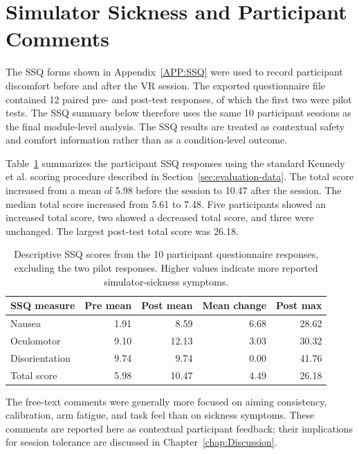 \section{Simulator Sickness and Participant Comments}
\label{sec:results-ssq}

The SSQ forms shown in Appendix~\ref{APP:SSQ} were used to record participant discomfort before and after the VR session. The exported questionnaire file contained 12 paired pre- and post-test responses, of which the first two were pilot tests. The SSQ summary below therefore uses the same 10 participant sessions as the final module-level analysis. The SSQ results are treated as contextual safety and comfort information rather than as a condition-level outcome.

Table~\ref{tab:results-ssq-summary} summarizes the participant SSQ responses using the standard Kennedy et al. scoring procedure described in Section~\ref{sec:evaluation-data}. The total score increased from a mean of 5.98 before the session to 10.47 after the session. The median total score increased from 5.61 to 7.48. Five participants showed an increased total score, two showed a decreased total score, and three were unchanged. The largest post-test total score was 26.18.

\begin{table}[H]
    \centering
    \footnotesize
    \setlength{\tabcolsep}{5pt}
    \renewcommand{\arraystretch}{1.15}
    \begin{tabular}{lrrrr}
        \toprule
        \textbf{SSQ measure} & \textbf{Pre mean} & \textbf{Post mean} & \textbf{Mean change} & \textbf{Post max} \\
        \midrule
        Nausea & 1.91 & 8.59 & 6.68 & 28.62 \\
        Oculomotor & 9.10 & 12.13 & 3.03 & 30.32 \\
        Disorientation & 9.74 & 9.74 & 0.00 & 41.76 \\
        Total score & 5.98 & 10.47 & 4.49 & 26.18 \\
        \bottomrule
    \end{tabular}
    \caption{Descriptive SSQ scores from the 10 participant questionnaire responses, excluding the two pilot responses. Higher values indicate more reported simulator-sickness symptoms.}
    \label{tab:results-ssq-summary}
\end{table}

The free-text comments were generally more focused on aiming consistency, calibration, arm fatigue, and task feel than on sickness symptoms. These comments are reported here as contextual participant feedback; their implications for session tolerance are discussed in Chapter~\ref{chap:Discussion}.

